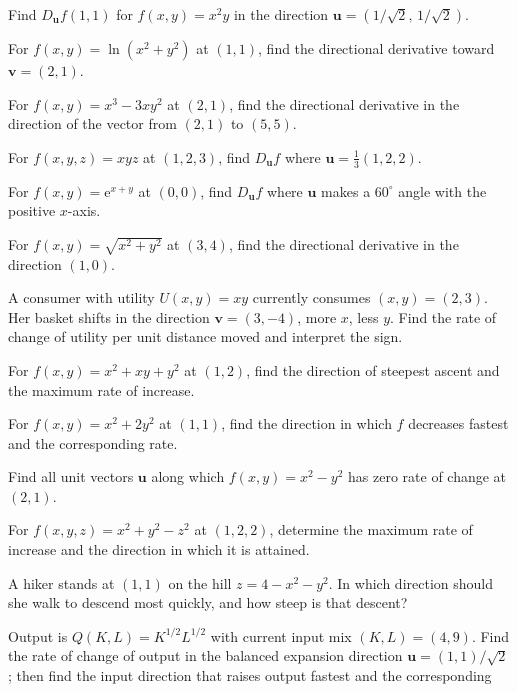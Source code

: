 \begin{problems}
  \item Find $D_{\mathbf{u}}f(1,1)$ for $f(x,y)=x^{2}y$ in the direction
        $\mathbf{u}=(1/\sqrt{2},\,1/\sqrt{2})$.
  \item For $f(x,y)=\ln(x^{2}+y^{2})$ at $(1,1)$, find the directional
        derivative toward $\mathbf{v}=(2,1)$.
  \item For $f(x,y)=x^{3}-3xy^{2}$ at $(2,1)$, find the directional
        derivative in the direction of the vector from $(2,1)$ to
        $(5,5)$.
  \item For $f(x,y,z)=xyz$ at $(1,2,3)$, find $D_{\mathbf{u}}f$ where
        $\mathbf{u}=\tfrac{1}{3}(1,2,2)$.
  \item For $f(x,y)=\mathrm{e}^{x+y}$ at $(0,0)$, find $D_{\mathbf{u}}f$
        where $\mathbf{u}$ makes a $60^{\circ}$ angle with the positive
        $x$-axis.
  \item For $f(x,y)=\sqrt{x^{2}+y^{2}}$ at $(3,4)$, find the directional
        derivative in the direction $(1,0)$.
  \item A consumer with utility $U(x,y)=xy$ currently consumes
        $(x,y)=(2,3)$. Her basket shifts in the direction
        $\mathbf{v}=(3,-4)$, more $x$, less $y$. Find the rate of
        change of utility per unit distance moved and interpret the sign.
  \item For $f(x,y)=x^{2}+xy+y^{2}$ at $(1,2)$, find the direction of
        steepest ascent and the maximum rate of increase.
  \item For $f(x,y)=x^{2}+2y^{2}$ at $(1,1)$, find the direction in which
        $f$ decreases fastest and the corresponding rate.
  \item Find all unit vectors $\mathbf{u}$ along which
        $f(x,y)=x^{2}-y^{2}$ has zero rate of change at $(2,1)$.
  \item For $f(x,y,z)=x^{2}+y^{2}-z^{2}$ at $(1,2,2)$, determine the
        maximum rate of increase and the direction in which it is
        attained.
  \item A hiker stands at $(1,1)$ on the hill $z=4-x^{2}-y^{2}$. In which
        direction should she walk to descend most quickly, and how steep
        is that descent?
  \item Output is $Q(K,L)=K^{1/2}L^{1/2}$ with current input mix
        $(K,L)=(4,9)$. Find the rate of change of output in the balanced
        expansion direction $\mathbf{u}=(1,1)/\sqrt{2}$; then find the
        input direction that raises output fastest and the corresponding

\end{problems}
